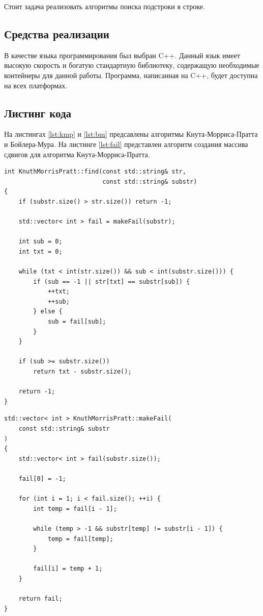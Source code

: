 \documentclass[a4paper,12pt]{article}
\begin{document}
Стоит задача реализовать алгоритмы поиска подстроки в строке.

\subsection{Средства реализации}

В качестве языка программирования был выбран {\ttfamily C++}.
Данный язык имеет высокую скорость и богатую стандартную библиотеку,
содержащую необходимые контейнеры для данной работы. Программа, написанная на
{\ttfamily C++}, будет доступна на всех платформах.

\subsection{Листинг кода}

На листингах \ref{lst:kmp} и \ref{lst:bm} предсавлены алгоритмы
Кнута-Морриса-Пратта и Бойлера-Мура. На листинге \ref{lst:fail} представлен
алгоритм создания массива сдвигов для алгоритма Кнута-Морриса-Пратта.

\begin{lstlisting}[caption=Алгоритм Кнута-Морриса-Пратта,label=lst:kmp]
int KnuthMorrisPratt::find(const std::string& str,
                           const std::string& substr)
{
    if (substr.size() > str.size()) return -1;

    std::vector< int > fail = makeFail(substr);

    int sub = 0;
    int txt = 0;

    while (txt < int(str.size()) && sub < int(substr.size())) {
        if (sub == -1 || str[txt] == substr[sub]) {
            ++txt;
            ++sub;
        } else {
            sub = fail[sub];
        }
    }

    if (sub >= substr.size())
        return txt - substr.size();

    return -1;
}
\end{lstlisting}

\begin{lstlisting}[caption=Алгоритм создания массива сдвигов,label=lst:fail]
std::vector< int > KnuthMorrisPratt::makeFail(
    const std::string& substr
)
{
    std::vector< int > fail(substr.size());

    fail[0] = -1;

    for (int i = 1; i < fail.size(); ++i) {
        int temp = fail[i - 1];

        while (temp > -1 && substr[temp] != substr[i - 1]) {
            temp = fail[temp];
        }

        fail[i] = temp + 1;
    }

    return fail;
}
\end{lstlisting}
\end{document}
